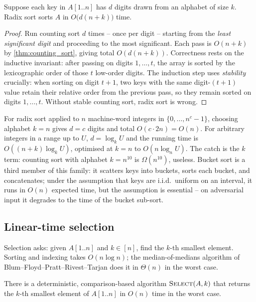 \begin{theorem}
\label{thm:radix_sort}
Suppose each key in $A[1..n]$ has $d$ digits drawn from an alphabet of size $k$. Radix sort sorts $A$ in $O\!\bigl(d(n + k)\bigr)$ time.
\end{theorem}

\begin{proof}
\sketchproof Run counting sort $d$ times -- once per digit -- starting from the \emph{least significant digit} and proceeding to the most significant. Each pass is $O(n + k)$ by \cref{thm:counting_sort}, giving total $O(d(n + k))$. Correctness rests on the inductive invariant: after passing on digits $1, \dots, t$, the array is sorted by the lexicographic order of those $t$ low-order digits. The induction step uses \emph{stability} crucially: when sorting on digit $t+1$, two keys with the same digit-$(t+1)$ value retain their relative order from the previous pass, so they remain sorted on digits $1, \dots, t$. Without stable counting sort, radix sort is wrong.
\end{proof}

\begin{remark}
For radix sort applied to $n$ machine-word integers in $\{0, \dots, n^c - 1\}$, choosing alphabet $k = n$ gives $d = c$ digits and total $O(c \cdot 2n) = O(n)$. For arbitrary integers in a range up to $U$, $d = \log_k U$ and the running time is $O((n + k) \log_k U)$, optimised at $k = n$ to $O(n \log_n U)$. The catch is the $k$ term: counting sort with alphabet $k = n^{10}$ is $\Omega(n^{10})$, useless. Bucket sort is a third member of this family: it scatters keys into buckets, sorts each bucket, and concatenates; under the assumption that keys are i.i.d.\ uniform on an interval, it runs in $O(n)$ expected time, but the assumption is essential -- on adversarial input it degrades to the time of the bucket sub-sort.
\end{remark}

\subsection{Linear-time selection}

Selection asks: given $A[1..n]$ and $k \in [n]$, find the $k$-th smallest element. Sorting and indexing takes $O(n \log n)$; the median-of-medians algorithm of Blum--Floyd--Pratt--Rivest--Tarjan does it in $\Theta(n)$ in the worst case.

\begin{theorem}
\label{thm:select_linear}
There is a deterministic, comparison-based algorithm $\textsc{Select}(A, k)$ that returns the $k$-th smallest element of $A[1..n]$ in $O(n)$ time in the worst case.
\end{theorem}

